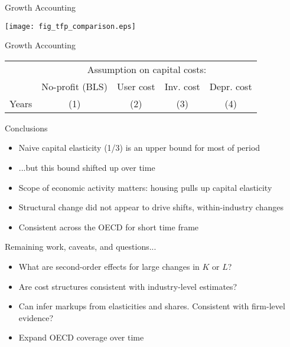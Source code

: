 \documentclass[10pt, xcolor=dvipsnames]{beamer}
\begin{document}
\begin{frame}{Growth Accounting}
\begin{center}
\texttt{[image: fig\_tfp\_comparison.eps]}
\end{center}
\end{frame}

\begin{frame}{Growth Accounting}
\begin{center}
\begin{tabular}{lcccc}
\midrule
        & \multicolumn{4}{c}{Assumption on capital costs:} \\ \cmidrule(lr){2-5}
 &  No-profit (BLS) & User cost & Inv. cost & Depr. cost \\
Years & (1) & (2) & (3) & (4) \\
\midrule

\midrule
\end{tabular}
\end{center}
\end{frame}

\begin{frame}{Conclusions}
\begin{itemize}
  \item Naive capital elasticity (1/3) is an upper bound for most of period
  \item ...but this bound shifted up over time
  \item Scope of economic activity matters: housing pulls up capital elasticity
  \item Structural change did not appear to drive shifts, within-industry changes
  \item Consistent across the OECD for short time frame
\end{itemize}
\vspace{.25in}
Remaining work, caveats, and questions...
\begin{itemize}
  \item What are second-order effects for large changes in $K$ or $L$?
  \item Are cost structures consistent with industry-level estimates?
  \item Can infer markups from elasticities and shares. Consistent with firm-level evidence?
  \item Expand OECD coverage over time
\end{itemize}
\end{frame}
\end{document}
